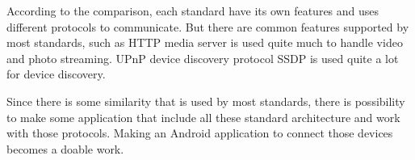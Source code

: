 \begin{enumerate}
\end{enumerate} 

According to the comparison, each standard have its own features and uses different protocols 
to communicate. But there are common features supported by most standards, such as HTTP media 
server is used quite much to handle video and photo streaming. UPnP device discovery protocol 
SSDP is used quite a lot for device discovery. 

Since there is some similarity that is used by most standards, there is possibility to make 
some application that include all these standard architecture and work with those protocols. 
Making an Android application to connect those devices becomes a doable work.

